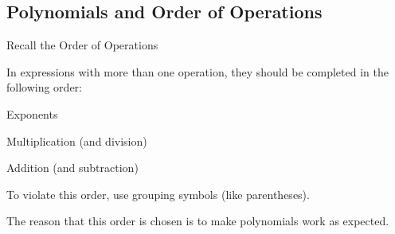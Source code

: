 \subsection{Polynomials and Order of Operations}
Recall the Order of Operations 
\begin{definition}
In expressions with more than one operation, they should be completed in the following order:
\begin{enumerate*}
\item Exponents
\item Multiplication (and division)
\item Addition (and subtraction)
\end{enumerate*}
To violate this order, use grouping symbols (like parentheses).
\end{definition}
The reason that this order is chosen is to make polynomials work as expected.
